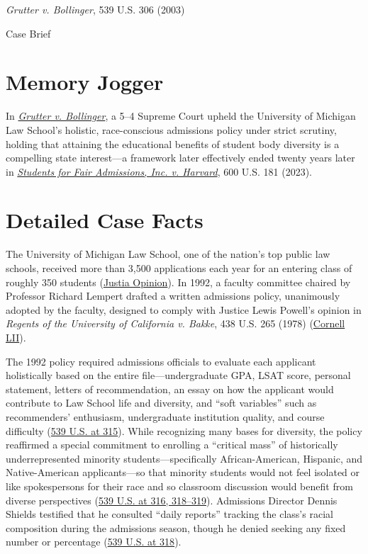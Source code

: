 \documentclass[12pt]{article}
\begin{document}
\begin{center}
{\LARGE \textit{Grutter v. Bollinger}, 539 U.S. 306 (2003)\par}
\vspace{0.8em}
{\large Case Brief\par}
\end{center}
\vspace{1em}

\section{Memory Jogger}
In \href{https://www.courtlistener.com/opinion/130155/grutter-v-bollinger/}{\textit{Grutter v. Bollinger}}, a 5--4 Supreme Court upheld the University of Michigan Law School's holistic, race-conscious admissions policy under strict scrutiny, holding that attaining the educational benefits of student body diversity is a compelling state interest---a framework later effectively ended twenty years later in \href{https://supreme.justia.com/cases/federal/us/600/20-1199/}{\textit{Students for Fair Admissions, Inc. v. Harvard}}, 600 U.S. 181 (2023).

\section{Detailed Case Facts}
The University of Michigan Law School, one of the nation's top public law schools, received more than 3,500 applications each year for an entering class of roughly 350 students (\href{https://supreme.justia.com/cases/federal/us/539/306/}{Justia Opinion}). In 1992, a faculty committee chaired by Professor Richard Lempert drafted a written admissions policy, unanimously adopted by the faculty, designed to comply with Justice Lewis Powell's opinion in \textit{Regents of the University of California v. Bakke}, 438 U.S. 265 (1978) (\href{https://www.law.cornell.edu/supremecourt/text/02-241}{Cornell LII}).

The 1992 policy required admissions officials to evaluate each applicant holistically based on the entire file---undergraduate GPA, LSAT score, personal statement, letters of recommendation, an essay on how the applicant would contribute to Law School life and diversity, and ``soft variables'' such as recommenders' enthusiasm, undergraduate institution quality, and course difficulty (\href{https://supreme.justia.com/cases/federal/us/539/306/}{539 U.S. at 315}). While recognizing many bases for diversity, the policy reaffirmed a special commitment to enrolling a ``critical mass'' of historically underrepresented minority students---specifically African-American, Hispanic, and Native-American applicants---so that minority students would not feel isolated or like spokespersons for their race and so classroom discussion would benefit from diverse perspectives (\href{https://supreme.justia.com/cases/federal/us/539/306/}{539 U.S. at 316, 318--319}). Admissions Director Dennis Shields testified that he consulted ``daily reports'' tracking the class's racial composition during the admissions season, though he denied seeking any fixed number or percentage (\href{https://supreme.justia.com/cases/federal/us/539/306/}{539 U.S. at 318}).
\end{document}
